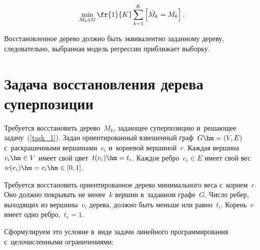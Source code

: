 \begin{multicols}{2}
\vspace*{-2pt}

\noindent
$$
\min_{M_k \in G} \fr{1}{K}\sum\limits_{k=1}^K \left[ \hat{M_k} = M_k\right].
$$

\vspace*{-2pt}

\noindent
Восстановленное дерево должно быть эквивалентно заданному дереву, следовательно, 
выбранная модель регрессии при\-бли\-жа\-ет выборку.

\vspace*{-12pt}

\section{Задача восстановления дерева суперпозиции}

\vspace*{-3pt}

Требуется восстановить дерево~$M_k$, задающее  суперпозицию и~решающее 
задачу~(\ref{task_1}). Задан ориентированный взвешенный граф~$G\hm=(V,E)$ 
с~раскрашенными вершинами~$v_i$ и~корневой вершиной~$r$. Каждая вершина~$v_i \hm\in 
V$ имеет свой цвет~$t(v_i)\hm=t_i$. Каждое реб\-ро~$e_i\in E$ имеет свой 
вес~\mbox{$w(e_i)\hm=c_i\hm\in[0,1]$}.

Требуется восстановить ориентированное дерево минимального веса с~корнем~$r$. 
Оно должно покрывать не менее~$k$ вершин в~заданном графе~$G$. Чис\-ло ребер, 
выходящих из вершины~$v_i$ дерева, должно быть меньше или равно~$t_i$. 
Корень~$r$ имеет одно ребро,~$t_r=1$.

Сформулируем это условие в~виде задачи линейного программирования 
с~целочисленными ограничениями:

\vspace*{2pt}


\end{multicols}

